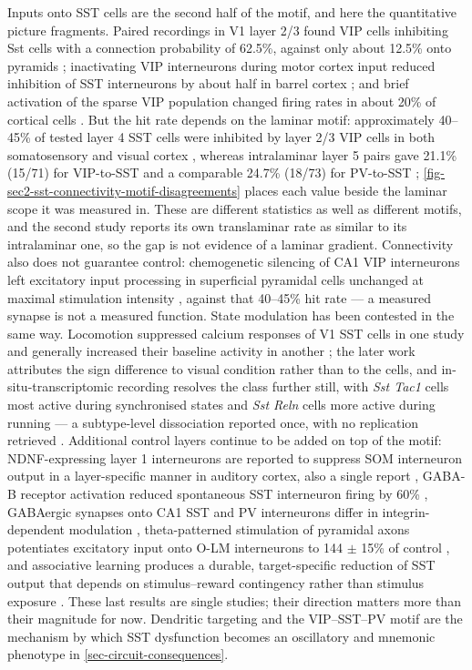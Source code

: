 \documentclass[11pt]{article}
\begin{document}
Inputs onto SST cells are the second half of the motif, and here the quantitative picture fragments. Paired recordings in V1 layer 2/3 found VIP cells inhibiting Sst cells with a connection probability of 62.5\%, against only about 12.5\% onto pyramids \citep{Pfeffer2013}; inactivating VIP interneurons during motor cortex input reduced inhibition of SST interneurons by about half in barrel cortex \citep{Lee2013}; and brief activation of the sparse VIP population changed firing rates in about 20\% of cortical cells \citep{Pi2013}. But the hit rate depends on the laminar motif: approximately 40--45\% of tested layer 4 SST cells were inhibited by layer 2/3 VIP cells in both somatosensory and visual cortex \citep{Rachel2025}, whereas intralaminar layer 5 pairs gave 21.1\% (15/71) for VIP-to-SST and a comparable 24.7\% (18/73) for PV-to-SST \citep{Preuss2025}; \ref{fig-sec2-sst-connectivity-motif-disagreements} places each value beside the laminar scope it was measured in. These are different statistics as well as different motifs, and the second study reports its own translaminar rate as similar to its intralaminar one, so the gap is not evidence of a laminar gradient. Connectivity also does not guarantee control: chemogenetic silencing of CA1 VIP interneurons left excitatory input processing in superficial pyramidal cells unchanged at maximal stimulation intensity \citep{Iloun2026}, against that 40--45\% hit rate \citep{Rachel2025} --- a measured synapse is not a measured function. State modulation has been contested in the same way. Locomotion suppressed calcium responses of V1 SST cells in one study \citep{Fu2014} and generally increased their baseline activity in another \citep{Dipoppa2018}; the later work attributes the sign difference to visual condition rather than to the cells, and in-situ-transcriptomic recording resolves the class further still, with \emph{Sst Tac1} cells most active during synchronised states and \emph{Sst Reln} cells more active during running --- a subtype-level dissociation reported once, with no replication retrieved \citep{Bugeon2022}. Additional control layers continue to be added on top of the motif: NDNF-expressing layer 1 interneurons are reported to suppress SOM interneuron output in a layer-specific manner in auditory cortex, also a single report \citep{Naumann2025}, GABA-B receptor activation reduced spontaneous SST interneuron firing by 60\% \citep{Kanigowski2023}, GABAergic synapses onto CA1 SST and PV interneurons differ in integrin-dependent modulation \citep{Brzdak2023}, theta-patterned stimulation of pyramidal axons potentiates excitatory input onto O-LM interneurons to 144 $\pm$ 15\% of control \citep{Sammari2022}, and associative learning produces a durable, target-specific reduction of SST output that depends on stimulus--reward contingency rather than stimulus exposure \citep{Park2025}. These last results are single studies; their direction matters more than their magnitude for now. Dendritic targeting and the VIP--SST--PV motif are the mechanism by which SST dysfunction becomes an oscillatory and mnemonic phenotype in \ref{sec-circuit-consequences}.
\end{document}
